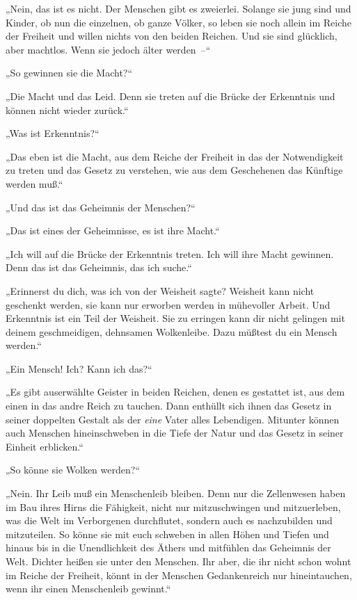 „Nein, das ist es nicht. Der Menschen gibt es zweierlei. Solange
sie jung sind und Kinder, ob nun die einzelnen, ob ganze Völker, so
leben sie noch allein im Reiche der Freiheit und willen nichts von
den beiden Reichen. Und sie sind glücklich, aber machtlos. Wenn sie
jedoch älter werden~–“

„So gewinnen sie die Macht?“

„Die Macht und das Leid. Denn sie treten auf die Brücke der
Erkenntnis und können nicht wieder zurück.“

„Was ist Erkenntnis?“

„Das eben ist die Macht, aus dem Reiche der Freiheit in das der
Notwendigkeit zu treten und das Gesetz zu verstehen, wie aus dem
Geschehenen das Künftige werden muß.“

„Und das ist das Geheimnis der Menschen?“

„Das ist eines der Geheimnisse, es ist ihre Macht.“

„Ich will auf die Brücke der Erkenntnis treten. Ich will ihre Macht
gewinnen. Denn das ist das Geheimnis, das ich suche.“

„Erinnerst du dich, was ich von der Weisheit sagte? Weisheit kann
nicht geschenkt werden, sie kann nur erworben werden in mühevoller
Arbeit. Und Erkenntnis ist ein Teil der Weisheit. Sie zu erringen
kann dir nicht gelingen mit deinem geschmeidigen, dehnsamen
Wolkenleibe. Dazu müßtest du ein Mensch werden.“

„Ein Mensch! Ich? Kann ich das?“

„Es gibt auserwählte Geister in beiden Reichen, denen es gestattet
ist, aus dem einen in das andre Reich zu tauchen. Dann enthüllt
sich ihnen das Gesetz in seiner doppelten Gestalt als der
\emph{eine} Vater alles Lebendigen. Mitunter können auch Menschen
hineinschweben in die Tiefe der Natur und das Gesetz in seiner
Einheit erblicken.“

„So könne sie Wolken werden?“

„Nein. Ihr Leib muß ein Menschenleib bleiben. Denn nur die
Zellenwesen haben im Bau ihres Hirns die Fähigkeit, nicht nur
mitzuschwingen und mitzuerleben, was die Welt im Verborgenen
durchflutet, sondern auch es nachzubilden und mitzuteilen. So könne
sie mit euch schweben in allen Höhen und Tiefen und hinaus bis in
die Unendlichkeit des Äthers und mitfühlen das Geheimnis der Welt.
Dichter heißen sie unter den Menschen. Ihr aber, die ihr nicht
schon wohnt im Reiche der Freiheit, könnt in der Menschen
Gedankenreich nur hineintauchen, wenn ihr einen Menschenleib
gewinnt.“

